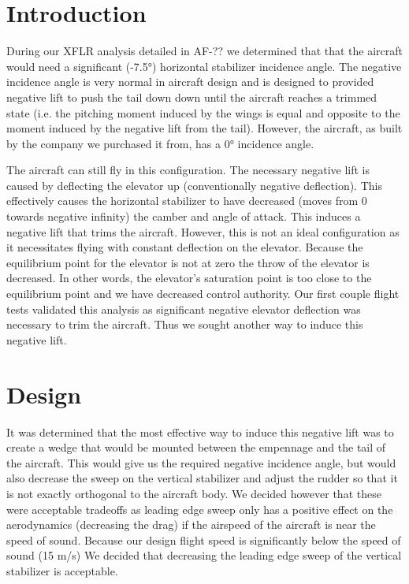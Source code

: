 \documentclass[]{auvsi_doc}
\begin{document}
\begin{AUVSITitlePage}
\begin{artifacttable} 
\end{artifacttable}

\end{AUVSITitlePage}
\section{Introduction}

During our XFLR analysis detailed in AF-?? we determined that that the aircraft would need a significant (-7.5°) horizontal stabilizer incidence angle. The negative incidence angle is very normal in aircraft design and is designed to provided negative lift to push the tail down down until the aircraft reaches a trimmed state (i.e. the pitching moment induced by the wings is equal and opposite to the moment induced by the negative lift from the tail). However, the aircraft, as built by the company we purchased it from, has a 0° incidence angle. 

The aircraft can still fly in this configuration. The necessary negative lift is caused by deflecting the elevator up (conventionally negative deflection). This effectively causes the horizontal stabilizer to have decreased (moves from 0 towards negative infinity) the camber and angle of attack. This induces a negative lift that trims the aircraft.  However, this is not an ideal configuration as it necessitates flying with constant deflection on the elevator. Because the equilibrium point for the elevator is not at zero the throw of the elevator is decreased. In other words, the elevator's saturation point is too close to the equilibrium point and we have decreased control authority. Our first couple flight tests validated this analysis as significant negative elevator deflection was necessary to trim the aircraft. Thus we sought another way to induce this negative lift. 

\section{Design}

It was determined that the most effective way to induce this negative lift was to create a wedge that would be mounted between the empennage and the tail of the aircraft. This would give us the required negative incidence angle, but would also decrease the sweep on the vertical stabilizer and adjust the rudder so that it is not exactly orthogonal to the aircraft body. We decided however that these were acceptable tradeoffs as leading edge sweep only has a positive effect on the aerodynamics (decreasing the drag) if the airspeed of the aircraft is near the speed of sound. Because our design flight speed is significantly below the speed of sound (15 m/s) We decided that decreasing the leading edge sweep of the vertical stabilizer is acceptable.
 
\end{document}
